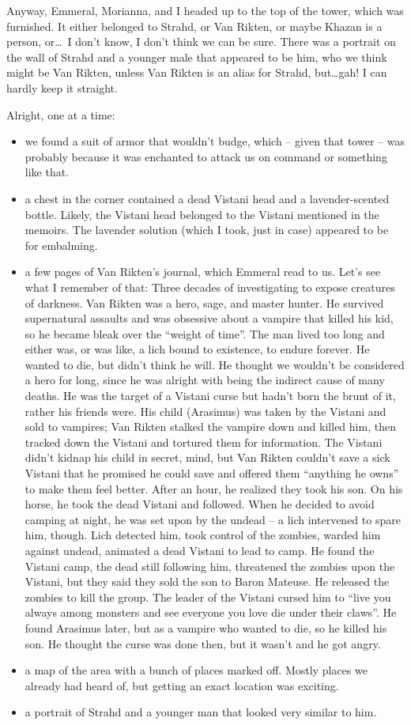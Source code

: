 Anyway, Emmeral, Morianna, and I headed up to the top of the tower, which was furnished. It either belonged to Strahd, or Van Rikten, or maybe Khazan is a person, or\dots\ I don't know, I don't think we can be sure. There was a portrait on the wall of Strahd and a younger male that appeared to be him, who we think might be Van Rikten, unless Van Rikten is an alias for Strahd, but\dots gah! I can hardly keep it straight.

Alright, one at a time:
\begin{itemize}
\item we found a suit of armor that wouldn't budge, which -- given that tower -- was probably because it was enchanted to attack us on command or something like that.
\item a chest in the corner contained a dead Vistani head and a lavender-scented bottle. Likely, the Vistani head belonged to the Vistani mentioned in the memoirs. The lavender solution (which I took, just in case) appeared to be for embalming.
\item a few pages of Van Rikten's journal, which Emmeral read to us. Let's see what I remember of that: Three decades of investigating to expose creatures of darkness. Van Rikten was a hero, sage, and master hunter. He survived supernatural assaults and was obsessive about a vampire that killed his kid, so he became bleak over the ``weight of time''. The man lived too long and either was, or was like, a lich bound to existence, to endure forever. He wanted to die, but didn't think he will. He thought we wouldn't be considered a hero for long, since he was alright with being the indirect cause of many deaths. He was the target of a Vistani curse but hadn't born the brunt of it, rather his friends were. His child (Arasimus) was taken by the Vistani and sold to vampires; Van Rikten stalked the vampire down and killed him, then tracked down the Vistani and tortured them for information. The Vistani didn't kidnap his child in secret, mind, but Van Rikten couldn't save a sick Vistani that he promised he could save and offered them ``anything he owns'' to make them feel better. After an hour, he realized they took his son. On his horse, he took the dead Vistani and followed. When he decided to avoid camping at night, he was set upon by the undead -- a lich intervened to spare him, though. Lich detected him, took control of the zombies, warded him against undead, animated a dead Vistani to lead to camp. He found the Vistani camp, the dead still following him, threatened the zombies upon the Vistani, but they said they sold the son to Baron Mateuse. He released the zombies to kill the group. The leader of the Vistani cursed him to ``live you always among monsters and see everyone you love die under their claws''. He found Arasimus later, but as a vampire who wanted to die, so he killed his son. He thought the curse was done then, but it wasn't and he got angry.
\item a map of the area with a bunch of places marked off. Mostly places we already had heard of, but getting an exact location was exciting.
\item a portrait of Strahd and a younger man that looked very similar to him.
\end{itemize}

